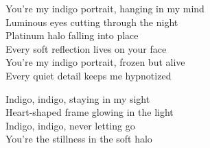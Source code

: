 \begin{lyrics}
You’re my indigo portrait, hanging in my mind\\
Luminous eyes cutting through the night\\
Platinum halo falling into place\\
Every soft reflection lives on your face\\
You’re my indigo portrait, frozen but alive\\
Every quiet detail keeps me hypnotized

Indigo, indigo, staying in my sight\\
Heart-shaped frame glowing in the light\\
Indigo, indigo, never letting go\\
You’re the stillness in the soft halo
\end{lyrics}

